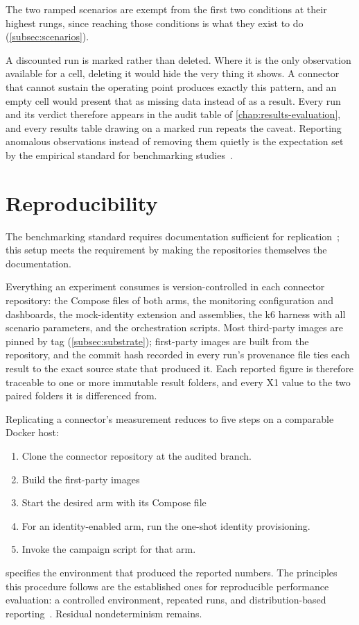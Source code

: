 The two ramped scenarios are exempt from the first two conditions at their highest rungs, since reaching those conditions is what they exist to do (\cref{subsec:scenarios}).

A discounted run is marked rather than deleted. Where it is the only observation available for a cell, deleting it would hide the very thing it shows. A connector that cannot sustain the operating point produces exactly this pattern, and an empty cell would present that as missing data instead of as a result. Every run and its verdict therefore appears in the audit table of \cref{chap:results-evaluation}, and every results table drawing on a marked run repeats the caveat. Reporting anomalous observations instead of removing them quietly is the expectation set by the empirical standard for benchmarking studies~\citep{Ralph2020}.

\section{Reproducibility}\label{sec:reproducibility}

The benchmarking standard requires documentation sufficient for replication~\citep{Ralph2020, empiricalStandardsBenchmarking}; this setup meets the requirement by making the repositories themselves the documentation.

Everything an experiment consumes is version-controlled in each connector repository: the Compose files of both arms, the monitoring configuration and dashboards, the mock-identity extension and assemblies, the k6 harness with all scenario parameters, and the orchestration scripts. Most third-party images are pinned by tag (\cref{subsec:substrate}); first-party images are built from the repository, and the commit hash recorded in every run's provenance file ties each result to the exact source state that produced it. Each reported figure is therefore traceable to one or more immutable result folders, and every X1 value to the two paired folders it is differenced from.

Replicating a connector's measurement reduces to five steps on a comparable Docker host:

\begin{enumerate}[leftmargin=*, itemsep=1pt, topsep=4pt]
    \item Clone the connector repository at the audited branch.
    \item Build the first-party images
    \item Start the desired arm with its Compose file
    \item For an identity-enabled arm, run the one-shot identity provisioning.
    \item Invoke the campaign script for that arm.
\end{enumerate}
  specifies the environment that produced the reported numbers. The principles this procedure follows are the established ones for reproducible performance evaluation: a controlled environment, repeated runs, and distribution-based reporting~\citep{papadopoulos2021reproducible, hoefler2015scientific}. Residual nondeterminism remains.

